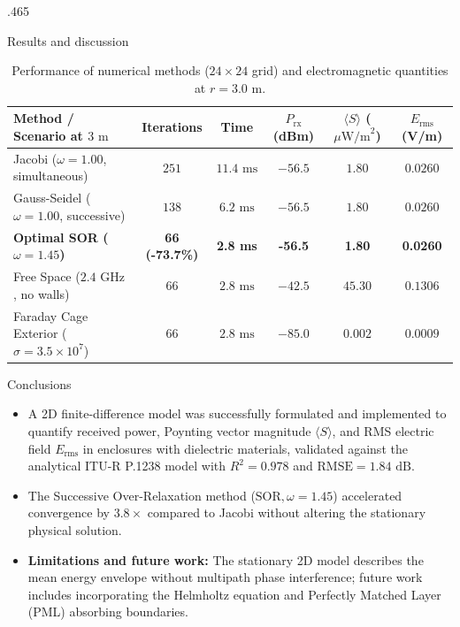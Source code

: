\documentclass[final]{beamer}
\begin{document}
\begin{frame}[t]
\begin{columns}[t]
\begin{column}{.465\paperwidth}
\begin{block}{Results and discussion}
					\begin{table}
						\centering
						\caption{Performance of numerical methods (\(24\times 24\) grid) and electromagnetic quantities at \(r = 3.0\text{ m}\).}
						\label{tab:convergence}
						\fontsize{20}{26}\selectfont
						\begin{tabular}{|l|c|c|c|c|c|}
							\hline
							\rowcolor{azulMarino!20}
							\textbf{Method / Scenario at \(3\text{ m}\)} & \textbf{Iterations} & \textbf{Time} & \textbf{\(P_{\text{rx}}\) (dBm)} & \textbf{\(\langle S \rangle\) (\(\mu\text{W/m}^2\))} & \textbf{\(E_{\text{rms}}\) (V/m)} \\
							\hline
							Jacobi (\(\omega = 1.00\), simultaneous) & \(251\) & \(11.4\text{ ms}\) & \(-56.5\) & \(1.80\) & \(0.0260\) \\
							\hline
							Gauss-Seidel (\(\omega = 1.00\), successive) & \(138\) & \(6.2\text{ ms}\) & \(-56.5\) & \(1.80\) & \(0.0260\) \\
							\hline
							\textbf{Optimal SOR (\(\omega = 1.45\))} & \textbf{66 (-73.7\%)} & \textbf{2.8 ms} & \textbf{-56.5} & \textbf{1.80} & \textbf{0.0260} \\
							\hline
							Free Space (\(2.4\text{ GHz}\), no walls) & \(66\) & \(2.8\text{ ms}\) & \(-42.5\) & \(45.30\) & \(0.1306\) \\
							\hline
							Faraday Cage Exterior (\(\sigma = 3.5\times 10^7\)) & \(66\) & \(2.8\text{ ms}\) & \(-85.0\) & \(0.002\) & \(0.0009\) \\
							\hline
						\end{tabular}
					\end{table}
				\end{block}
				
				\begin{block}{Conclusions}
					\begin{itemize}
						\item A 2D finite-difference model was successfully formulated and implemented to quantify received power, Poynting vector magnitude \(\langle S \rangle\), and RMS electric field \(E_{\text{rms}}\) in enclosures with dielectric materials, validated against the analytical ITU-R P.1238 model with \(R^2 = 0.978\) and \(\text{RMSE} = 1.84\text{ dB}\).
						\item The Successive Over-Relaxation method (\(\text{SOR}, \omega = 1.45\)) accelerated convergence by \(3.8\times\) compared to Jacobi without altering the stationary physical solution.
						\item \textbf{Limitations and future work:} The stationary 2D model describes the mean energy envelope without multipath phase interference; future work includes incorporating the Helmholtz equation and Perfectly Matched Layer (PML) absorbing boundaries.
					\end{itemize}
				\end{block}
				

\end{column}
\end{columns}
\end{frame}
\end{document}
